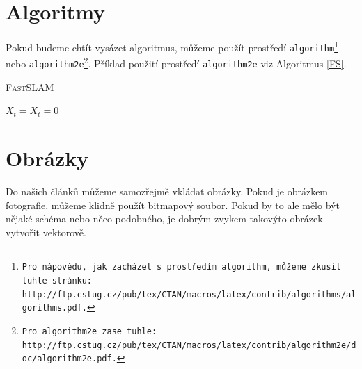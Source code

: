 \documentclass[a4paper, 11pt]{article}
\begin{document}
\section{Algoritmy}
\label{kap_3}
Pokud budeme chtít vysázet algoritmus, můžeme použít prostředí \texttt{algorithm\footnote{Pro nápovědu, jak zacházet s prostředím \texttt{algorithm}, můžeme zkusit tuhle stránku:\\
http://ftp.cstug.cz/pub/tex/CTAN/macros/latex/contrib/algorithms/algorithms.pdf.}} nebo \texttt{algorithm2e\footnote{Pro \texttt{algorithm2e} zase tuhle: http://ftp.cstug.cz/pub/tex/CTAN/macros/latex/contrib/algorithm2e/doc/algorithm2e.pdf.}}. Příklad použití prostředí \texttt{algorithm2e} viz Algoritmus \ref{FS}.

\begin{algorithm}
\label{FS}
\Indm
\caption{\textsc{\Indmm FastSLAM}}
\Indp

\SetNlSty{}{}{:}
$\overline{X_t} = X_t = 0$ \\
\end{algorithm}

\section{Obrázky}
Do našich článků můžeme samozřejmě vkládat obrázky. Pokud je obrázkem fotografie, můžeme klidně použít bitmapový soubor. Pokud by to ale mělo být nějaké schéma nebo něco podobného, je dobrým zvykem takovýto obrázek vytvořit vektorově.
\end{document}
